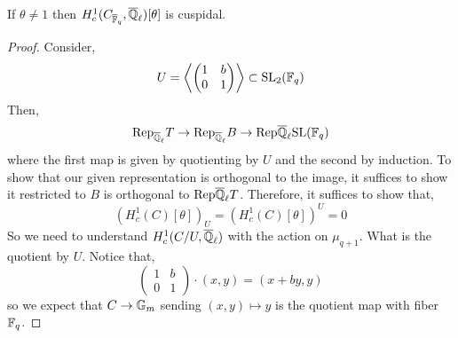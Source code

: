 \documentclass[12pt]{article}
\begin{document}
\begin{theorem}
If $\theta \neq 1$ then $H^1_c(C_{\overline{\mathbb{F}}_q}, \overline{\mathbb{Q}}_\ell)[\theta]$ is cuspidal. 
\end{theorem}

\begin{proof}
Consider,
\[ U = \left< 
\begin{pmatrix}
1 & b
\\
0 & 1 
\end{pmatrix} \right> \subset \mathrm{SL}_2(\mathbb{F}_q) \]
Then,
\[ \mathrm{Rep}_{\overline{\mathbb{Q}}_\ell}{T} \to \mathrm{Rep}_{\overline{\mathbb{Q}}_\ell}{B} \to \mathrm{Rep}{\overline{\mathbb{Q}}_\ell}{\mathrm{SL}(\mathbb{F}_q)} \]
where the first map is given by quotienting by $U$ and the second by induction. To show that our given representation is orthogonal to the image, it suffices to show it restricted to $B$ is orthogonal to $\mathrm{Rep}{\overline{\mathbb{Q}}_\ell}{T}$. Therefore, it suffices to show that,
\[ (H^1_c(C)[\theta])_U = (H^1_c(C)[\theta])^U = 0 \]
So we need to understand $H^1_c(C/U, \overline{\mathbb{Q}}_\ell)$ with the action on $\mu_{q+1}$. What is the quotient by $U$. Notice that,
\[ \begin{pmatrix}
1 & b 
\\
0 & 1 
\end{pmatrix} \cdot (x, y) = (x + b y, y) \]
so we expect that $C \to \mathbb{G}_m$ sending $(x,y) \mapsto y$ is the quotient map with fiber $\mathbb{F}_q$.
\end{proof}
\end{document}

